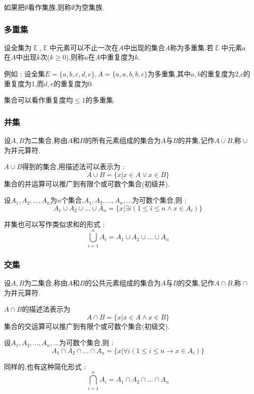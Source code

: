 \documentclass[UTF8,12pt]{ctexbook}
\newcommand{\updownUnion}[2]{\bigcup\limits_{#2}^{#1}}
\DeclareMathOperator{\mathEverythingCollection}{\mathbb{E}}
\DeclareMathOperator{\unionSet}{\cup}
\DeclareMathOperator{\intersectionSet}{\cap}
\begin{document}
{{{{{如果把$\emptyset$看作集族,则称$\emptyset$为空集族.
}%

\subsubsection{多重集}{
  设全集为$\mathEverythingCollection$,$\mathEverythingCollection$中元素可以不止一次在$A$中出现的集合$A$称为多重集.若$\mathEverythingCollection$中元素$a$在$A$中出现$k$次($k \geq 0$),则称$a$在$A$中重复度为$k$.

  例如 : 设全集$E = \{a,b,c,d,e\},A = \{a,a,b,b,c\}$为多重集,其中$a,b$的重复度为2,$c$的重复度为1,而$d,e$的重复度为0.

  集合可以看作重复度均$\leq 1$的多重集.
}%

\subsubsection{并集}{
  设$A,B$为二集合,称由$A$和$B$的所有元素组成的集合为$A$与$B$的并集,记作$A \unionSet B$,称$\unionSet$为并元算符.

  $A \unionSet B$得到的集合,用描述法可以表示为 : $$
    A \unionSet B = \{x | x \in A \lor x \in B\}
  $$
  集合的并运算可以推广到有限个或可数个集合(初级并).

  设$A_1,A_2,\dots,A_n$为$n$个集合,$A_1,A_2,\dots,A_n,\dots$为可数个集合,则 : $$
    A_1 \unionSet A_2 \unionSet \dots \unionSet A_n = \{x | \exists i (1 \leq i \leq n \land x \in A_i)\}
  $$

  并集也可以写作类似求和的形式 : $$
    \updownUnion{n}{i = 1}A_i = A_1 \unionSet A_2 \unionSet \dots \unionSet A_n
  $$

}%

\subsubsection{交集}{
  设$A,B$为二集合,称由$A$和$B$的公共元素组成的集合为$A$与$B$的交集,记作$A \intersectionSet B$,称$\intersectionSet$为并元算符.

  $A \intersectionSet B$的描述法表示为$$
    A \intersectionSet B = \{x | x \in A \land x \in B\}
  $$
  集合的交运算可以推广到有限个或可数个集合(初级交).

  设$A_1,A_2,\dots,A_n,\dots$为可数个集合,则 : $$
    A_1 \intersectionSet A_2 \intersectionSet \dots \intersectionSet A_n = \{x | \forall i (1 \leq i \leq n \to x \in A_i)\}
  $$

  同样的,也有这种简化形式 : $$
    \bigcap\limits_{i = 1}^{n}A_i = A_1 \intersectionSet A_2 \intersectionSet \dots \intersectionSet A_n
  $$
}%

}}}}
\end{document}
